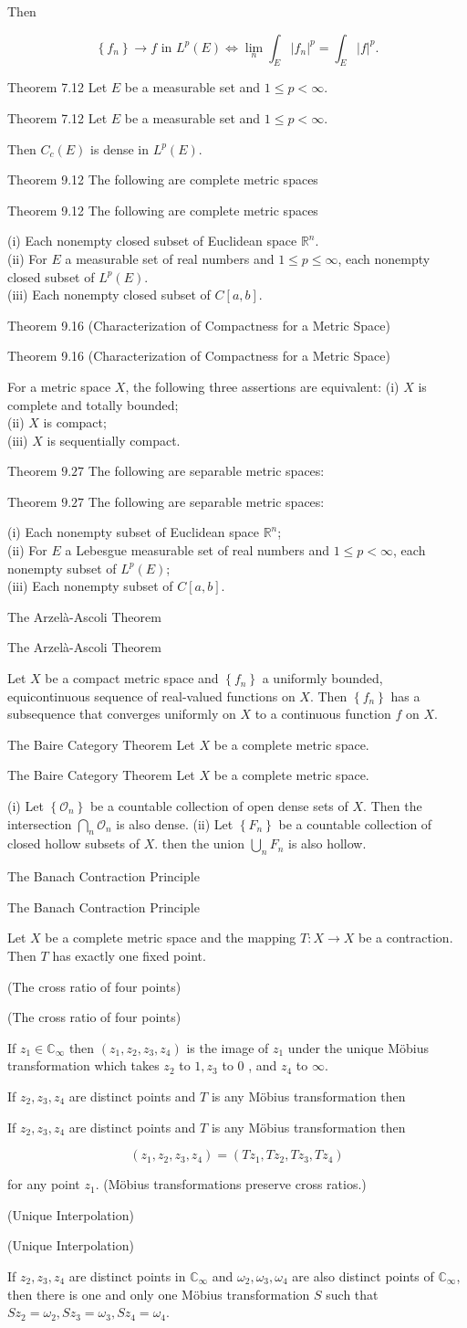 \documentclass[17pt]{extarticle}
\newcommand{\boxset}[2]{\begin{mdframed}[style=darkQuesion]
#1
\end{mdframed}
\newpage
\begin{mdframed}[style=darkQuesion]
#1
  \end{mdframed}
\begin{mdframed}[style=darkAnswer]
#2
  \end{mdframed}
  \newpage
}
\begin{document}
{Then

\[
\left\{f_{n}\right\} \rightarrow f \text { in } L^{p}(E) \Longleftrightarrow \lim _{n} \int_{E}\left|f_{n}\right|^{p}=\int_{E}|f|^{p} .
\]

}
\boxset{Theorem 7.12 Let $E$ be a measurable set and $1 \leq p<\infty$.}
{Then $C_{c}(E)$ is dense in $L^{p}(E)$.}
\boxset{Theorem 9.12 The following are complete metric spaces}
{
(i) Each nonempty closed subset of Euclidean space $\mathbb{R}^{n}$.\[\ \]
(ii) For $E$ a measurable set of real numbers and $1 \leq p \leq \infty$, each nonempty closed subset of $L^{p}(E)$.\[\ \]
(iii) Each nonempty closed subset of $C[a, b]$.
}
\boxset{Theorem 9.16 (Characterization of Compactness for a Metric Space)}
{For a metric space $X$, the following three assertions are equivalent:
(i) $X$ is complete and totally bounded;\[\ \]
(ii) $X$ is compact;\[\ \]
(iii) $X$ is sequentially compact.\[\ \]
}
\boxset{Theorem $9.27$ The following are separable metric spaces:}
{
(i) Each nonempty subset of Euclidean space $\mathbb{R}^{n}$;\[\ \]
(ii) For $E$ a Lebesgue measurable set of real numbers and $1 \leq p<\infty$, each nonempty subset of $L^{p}(E)$;\[\ \]
(iii) Each nonempty subset of $C[a, b]$.\[\ \]
}
\boxset{The Arzelà-Ascoli Theorem}
{Let $X$ be a compact metric space and $\left\{f_{n}\right\}$ a uniformly bounded, equicontinuous sequence of real-valued functions on $X$. Then $\left\{f_{n}\right\}$ has a subsequence that converges uniformly on $X$ to a continuous function $f$ on $X$.}
\boxset{The Baire Category Theorem Let $X$ be a complete metric space.}
{
(i) Let $\left\{\mathcal{O}_{n}\right\}$ be a countable collection of open dense sets of $X$. Then the intersection $\bigcap_{n} \mathcal{O}_{n}$ is also dense.
(ii) Let $\left\{F_{n}\right\}$ be a countable collection of closed hollow subsets of $X$. then the union $\bigcup_{n} F_{n}$ is also hollow.\[\ \]
}
\boxset{The Banach Contraction Principle}
{Let $X$ be a complete metric space and the mapping $T: X \rightarrow X$ be a contraction. Then $T$ has exactly one fixed point.}
\boxset{(The cross ratio of four points)}
{If $z_{1} \in \mathbb{C}_{\infty}$ then $\left(z_{1}, z_{2}, z_{3}, z_{4}\right)$ is the image of $z_{1}$ under the unique Möbius transformation which takes $z_{2}$ to $1, z_{3}$ to 0 , and $z_{4}$ to $\infty$.}

\boxset{If $z_{2}, z_{3}, z_{4}$ are distinct points and $T$ is any Möbius transformation then}
{

\[
\left(z_{1}, z_{2}, z_{3}, z_{4}\right)=\left(T z_{1}, T z_{2}, T z_{3}, T z_{4}\right)
\]

for any point $z_{1}$. (Möbius transformations preserve cross ratios.)
}
\boxset{(Unique Interpolation)}
{If $z_{2}, z_{3}, z_{4}$ are distinct points in $\mathbb{C}_{\infty}$ and $\omega_{2}, \omega_{3}, \omega_{4}$ are also distinct points of $\mathbb{C}_{\infty}$, then there is one and only one Möbius transformation $S$ such that $S z_{2}=\omega_{2}, S z_{3}=\omega_{3}, S z_{4}=\omega_{4}$.}
\end{document}
